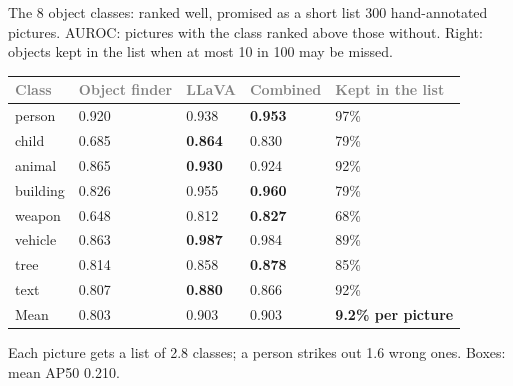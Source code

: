 \documentclass[aspectratio=169,11pt]{beamer}
\renewcommand{\arraystretch}{1.3}
\newcommand{\yes}[1]{\textcolor{accent}{\textbf{#1}}}
\newcommand{\h}[1]{\textcolor{grey}{#1}}
\newcommand{\remark}[1]{\par\vspace{0.35cm}{\small\textcolor{grey}{#1}}}
\begin{document}
\begin{frame}{The 8 object classes: ranked well, promised as a short list}
\footnotesize 300 hand-annotated pictures. AUROC: pictures with the class ranked above those without. Right: objects kept in the list when at most 10 in 100 may be missed.

\scriptsize\renewcommand{\arraystretch}{0.95}\begin{tabular}{@{}L{1.7cm} C{1.6cm} C{1.4cm} C{1.6cm} | C{2.6cm}@{}}
\toprule
\h{Class} & \h{Object finder} & \h{LLaVA} & \h{Combined} & \h{Kept in the list}\\
\midrule
person & 0.920 & 0.938 & \textbf{0.953} & 97\%\\
child & 0.685 & \textbf{0.864} & 0.830 & 79\%\\
animal & 0.865 & \textbf{0.930} & 0.924 & 92\%\\
building & 0.826 & 0.955 & \textbf{0.960} & 79\%\\
weapon & 0.648 & 0.812 & \textbf{0.827} & 68\%\\
vehicle & 0.863 & \textbf{0.987} & 0.984 & 89\%\\
tree & 0.814 & 0.858 & \textbf{0.878} & 85\%\\
text & 0.807 & \textbf{0.880} & 0.866 & 92\%\\
\midrule
Mean & 0.803 & 0.903 & 0.903 & \yes{9.2\% per picture}\\
\bottomrule
\end{tabular}

\footnotesize Each picture gets a list of 2.8 classes; a person strikes out 1.6 wrong ones. Boxes: mean AP50 0.210.
\remark{A promise on all decisions confirms at most 0.4\% of objects. LLaVA alone is as good as the combination; learning the weights does not help here.}
\end{frame}
\end{document}
